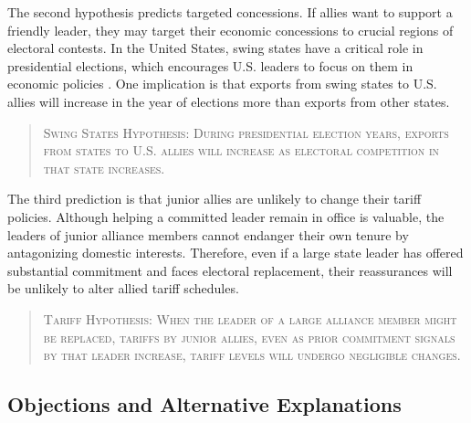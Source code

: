 \documentclass[12pt]{article}
\begin{document}
The second hypothesis predicts targeted concessions.
If allies want to support a friendly leader, they may target their economic concessions to crucial regions of electoral contests. 
In the United States, swing states have a critical role in presidential elections, which encourages U.S. leaders to focus on them in economic policies \citep{KrinerReeves2015, Conconietal2017}.
One implication is that exports from swing states to U.S. allies will increase in the year of elections more than exports from other states.


\begin{quote}
\textsc{Swing States Hypothesis: During presidential election years, exports from states to U.S. allies will increase as electoral competition in that state increases.}
\end{quote}

%
%
%


The third prediction is that junior allies are unlikely to change their tariff policies. 
Although helping a committed leader remain in office is valuable, the leaders of junior alliance members cannot endanger their own tenure by antagonizing domestic interests.
Therefore, even if a large state leader has offered substantial commitment and faces electoral replacement, their reassurances will be unlikely to alter allied tariff schedules. 


\begin{quote}
\textsc{Tariff Hypothesis:  When the leader of a large alliance member might be replaced, tariffs by junior allies, even as prior commitment signals by that leader increase, tariff levels will undergo negligible changes. }
\end{quote}



\subsection{Objections and Alternative Explanations}
\end{document}
